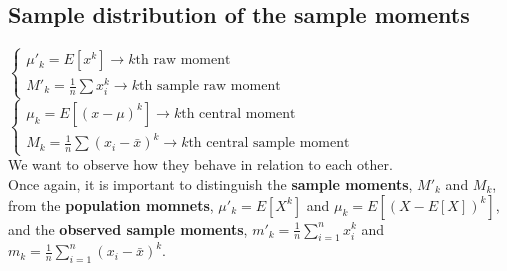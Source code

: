 \subsection{Sample distribution of the sample moments}
$\begin{cases*}
    \mu'_k = E[x^k] \to k\text{th raw moment}\\
    M'_k = \frac{1}{n}\sum x_i^k\to k\text{th sample raw moment}
\end{cases*}$ 
$\begin{cases*}
    \mu_k = E[(x-\mu)^k] \to k\text{th central moment}\\
    M_k = \frac{1}{n}\sum (x_i-\bar{x})^k\to k\text{th central sample moment}
\end{cases*}$\\
We want to observe how they behave in relation to each other.\\

Once again, it is important to distinguish the \textbf{sample moments}, $M'_k$ and $M_k$,
from the \textbf{population momnets}, $\mu'_k = E[X^k]$ and $\mu_k = E[(X-E[X])^k]$,
and the \textbf{observed sample moments}, $m'_k = \frac{1}{n}\sum_{i=1}^{n}x_i^k$ and $m_k = \frac{1}{n}\sum_{i=1}^{n}(x_i-\bar{x})^k$.


